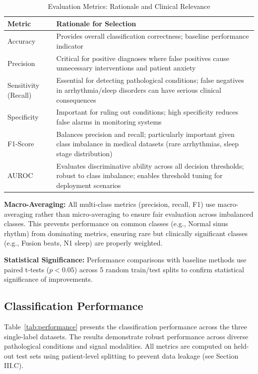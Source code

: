 \documentclass[conference]{IEEEtran}
\begin{document}
\begin{table}[htbp]
\caption{Evaluation Metrics: Rationale and Clinical Relevance}
\label{tab:metrics_justification}
\centering
\begin{tabular}{p{2.5cm}p{5cm}}
\toprule
\textbf{Metric} & \textbf{Rationale for Selection} \\
\midrule
Accuracy & Provides overall classification correctness; baseline performance indicator \\
\midrule
Precision & Critical for positive diagnoses where false positives cause unnecessary interventions and patient anxiety \\
\midrule
Sensitivity (Recall) & Essential for detecting pathological conditions; false negatives in arrhythmia/sleep disorders can have serious clinical consequences \\
\midrule
Specificity & Important for ruling out conditions; high specificity reduces false alarms in monitoring systems \\
\midrule
F1-Score & Balances precision and recall; particularly important given class imbalance in medical datasets (rare arrhythmias, sleep stage distribution) \\
\midrule
AUROC & Evaluates discriminative ability across all decision thresholds; robust to class imbalance; enables threshold tuning for deployment scenarios \\
\bottomrule
\end{tabular}
\end{table}

\textbf{Macro-Averaging:} All multi-class metrics (precision, recall, F1) use macro-averaging rather than micro-averaging to ensure fair evaluation across imbalanced classes. This prevents performance on common classes (e.g., Normal sinus rhythm) from dominating metrics, ensuring rare but clinically significant classes (e.g., Fusion beats, N1 sleep) are properly weighted.

\textbf{Statistical Significance:} Performance comparisons with baseline methods use paired t-tests ($p < 0.05$) across 5 random train/test splits to confirm statistical significance of improvements.

\subsection{Classification Performance}

Table~\ref{tab:performance} presents the classification performance across the three single-label datasets. The results demonstrate robust performance across diverse pathological conditions and signal modalities. All metrics are computed on held-out test sets using patient-level splitting to prevent data leakage (see Section III.C).
\end{document}
